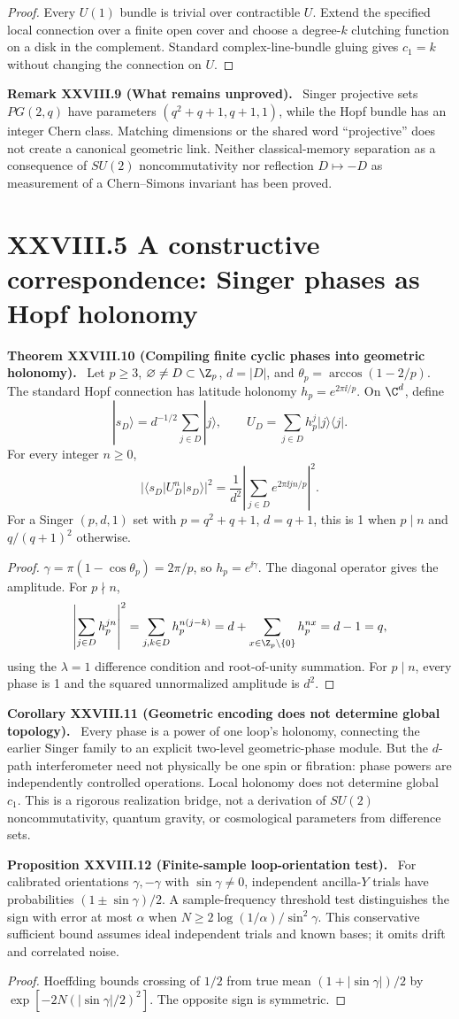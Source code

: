 \documentclass[11pt,a4paper,oneside]{book}
\newcommand{\statement}[3]{\par\medskip\noindent\textbf{#1 #2 (#3).}\ }
\begin{document}
\begin{proof}Every $U(1)$ bundle is trivial over contractible $U$. Extend the specified local connection over a finite open cover and choose a degree-$k$ clutching function on a disk in the complement. Standard complex-line-bundle gluing gives $c_1=k$ without changing the connection on $U$.\end{proof}
\statement{Remark}{XXVIII.9}{What remains unproved} Singer projective sets $PG(2,q)$ have parameters $(q^2+q+1,q+1,1)$, while the Hopf bundle has an integer Chern class. Matching dimensions or the shared word ``projective'' does not create a canonical geometric link. Neither classical-memory separation as a consequence of $SU(2)$ noncommutativity nor reflection $D\mapsto-D$ as measurement of a Chern--Simons invariant has been proved.
\section*{XXVIII.5 A constructive correspondence: Singer phases as Hopf holonomy}
\statement{Theorem}{XXVIII.10}{Compiling finite cyclic phases into geometric holonomy} Let $p\ge3$, $\varnothing\ne D\subset\Z_p$, $d=|D|$, and $\theta_p=\arccos(1-2/p)$. The standard Hopf connection has latitude holonomy $h_p=e^{2\pi\ii/p}$. On $\C^d$, define
\[|s_D\rangle=d^{-1/2}\sum_{j\in D}|j\rangle,\qquad U_D=\sum_{j\in D}h_p^j|j\rangle\langle j|.\]
For every integer $n\ge0$,
\[|\langle s_D|U_D^n|s_D\rangle|^2=\frac1{d^2}\left|\sum_{j\in D}e^{2\pi\ii jn/p}\right|^2.\]
For a Singer $(p,d,1)$ set with $p=q^2+q+1$, $d=q+1$, this is 1 when $p\mid n$ and $q/(q+1)^2$ otherwise.
\begin{proof}$\gamma=\pi(1-\cos\theta_p)=2\pi/p$, so $h_p=e^{\ii\gamma}$. The diagonal operator gives the amplitude. For $p\nmid n$,
\[\left|\sum_{j\in D}h_p^{jn}\right|^2=\sum_{j,k\in D}h_p^{n(j-k)}=d+\sum_{x\in\Z_p\setminus\{0\}}h_p^{nx}=d-1=q,\]
using the $\lambda=1$ difference condition and root-of-unity summation. For $p\mid n$, every phase is 1 and the squared unnormalized amplitude is $d^2$.\end{proof}
\statement{Corollary}{XXVIII.11}{Geometric encoding does not determine global topology} Every phase is a power of one loop's holonomy, connecting the earlier Singer family to an explicit two-level geometric-phase module. But the $d$-path interferometer need not physically be one spin or fibration: phase powers are independently controlled operations. Local holonomy does not determine global $c_1$. This is a rigorous realization bridge, not a derivation of $SU(2)$ noncommutativity, quantum gravity, or cosmological parameters from difference sets.
\statement{Proposition}{XXVIII.12}{Finite-sample loop-orientation test} For calibrated orientations $\gamma,-\gamma$ with $\sin\gamma\ne0$, independent ancilla-$Y$ trials have probabilities $(1\pm\sin\gamma)/2$. A sample-frequency threshold test distinguishes the sign with error at most $\alpha$ when $N\ge2\log(1/\alpha)/\sin^2\gamma$. This conservative sufficient bound assumes ideal independent trials and known bases; it omits drift and correlated noise.
\begin{proof}Hoeffding bounds crossing of $1/2$ from true mean $(1+|\sin\gamma|)/2$ by $\exp[-2N(|\sin\gamma|/2)^2]$. The opposite sign is symmetric.\end{proof}
\end{document}
